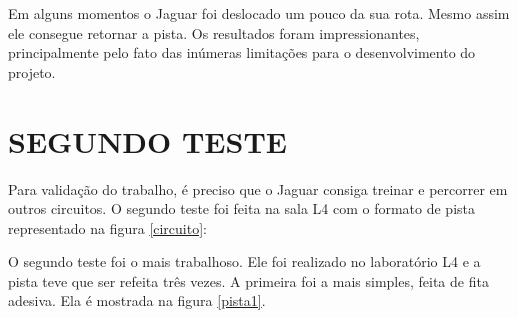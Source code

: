 Em alguns momentos o Jaguar foi deslocado um pouco da sua rota. Mesmo assim ele consegue retornar a pista. Os resultados foram impressionantes, principalmente pelo fato das inúmeras limitações para o desenvolvimento do projeto.

\section{SEGUNDO TESTE}
\label{segundo}

Para validação do trabalho, é preciso que o Jaguar consiga treinar e percorrer em outros circuitos. O segundo teste foi feita na sala L4 com o formato de pista representado na figura \ref{circuito}:

	\begin{figure}[H]
		\centering
\end{figure}

O segundo teste foi o mais trabalhoso. Ele foi realizado no laboratório L4 e a pista teve que ser refeita três vezes. A primeira foi a mais simples, feita de fita adesiva. Ela é mostrada na figura \ref{pista1}.

	\begin{figure}[H]
		\centering
\end{figure}

